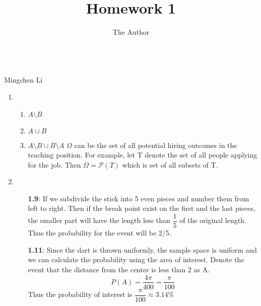\documentclass[11pt, oneside]{article}
\title{Homework 1}
\author{The Author}
\begin{document}
\begin{center}\\Mingchen Li\\ \end{center}

\hrulefill %

\begin{enumerate}
    \item \begin{enumerate}
        \item $A\setminus B $
        \item $A \cup B$
        \item $A\setminus B \cup B\setminus A$
        \newline $\Omega$ can be the set of all potential hiring outcomes in the teaching position. For example, let T denote the set of all people applying for the job. Then $\Omega=\mathcal{P}(T)$ which is set of all subsets of T.
    \end{enumerate}
    
    \item \begin{enumerate}
        \item[{\bf 1.9}:] If we subdivide the stick into 5 even pieces and number them from left to right. Then if the break point exist on the first and the last pieces, the smaller part will have the length less than $\dfrac{1}{5}$ of the original length. Thus the probability for the event will be 2/5.
        \item[{\bf 1.11}:] Since the dart is thrown uniformly, the sample space is uniform and we can calculate the probability using the area of interest. Denote the event that the distance from the center is less than 2 as A.
        \[P(A) =\dfrac{4\pi}{400}=\dfrac{\pi}{100}\]
        Thus the probability of interest is $\dfrac{\pi}{100}\approx 3.14\%$
        \end{enumerate}
    

\end{enumerate}
\end{document}
